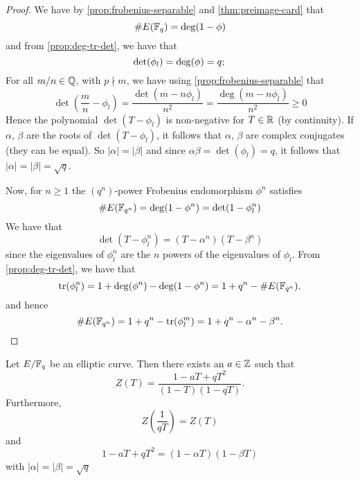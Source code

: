 \begin{proof}
	We have by \ref{prop:frobenius-separable}
	and \ref{thm:preimage-card}
	that
	\begin{equation*}
		\#E(\mathbb{F}_q) = \deg(1 - \phi)
	\end{equation*}
	and from \ref{prop:deg-tr-det}, we have that
	\begin{equation*}
		\det(\phi_l) = \deg(\phi) = q;\\
	\end{equation*}
	For all $m/n \in \mathbb{Q}$, with $p \nmid m$,
	we have using \ref{prop:frobenius-separable} that
	\begin{equation*}
		\det\left(\frac{m}{n} - \phi_l\right)
		= \frac{\det(m - n\phi_l)}{n^2}
		= \frac{\deg(m - n\phi_l)}{n^2} \geq 0
	\end{equation*}
	Hence the polynomial $\det(T - \phi_l)$ is non-negative for $T \in \mathbb{R}$
	(by continuity). If $\alpha$, $\beta$ are the roots of $\det(T - \phi_l)$,
	it follows that $\alpha$, $\beta$ are complex conjugates (they can be
	equal). So $|\alpha| = |\beta|$ and since $\alpha\beta = \det(\phi_l) = q$,
	it follows that $|\alpha| = |\beta| = \sqrt{q}$.

	Now, for $n \geq 1$ the $(q^n)$-power Frobenius endomorphism
	$\phi^n$ satisfies
	\begin{equation*}
		\#E(\mathbb{F}_{q^n}) = \deg(1 - \phi^n) = \det(1 - \phi_l^n)
	\end{equation*}
	We have that
	\begin{equation*}
		\det(T - \phi_l^n) = (T - \alpha^n)(T - \beta^n)
	\end{equation*}
	since the eigenvalues of $\phi_l^n$ are the $n$ powers
	of the eigenvalues of $\phi_l$. From 
	\ref{prop:deg-tr-det}, we have that
	\begin{equation*}
		\operatorname{tr}(\phi_l^n) = 1 + \deg(\phi^n) - \deg(1 - \phi^n)
		= 1 + q^n - \#E(\mathbb{F}_{q^n}).
	\end{equation*}
	and hence 
	\begin{equation*}
		\#E(\mathbb{F}_{q^n}) = 1 + q^n - \operatorname{tr}(\phi_l^m)
		= 1 + q^n - \alpha^n - \beta^n.
	\end{equation*}
\end{proof}

\begin{theorem}
	\label{thm:weil-elliptic}
	Let $E/\mathbb{F}_q$ be an elliptic curve. Then there exists an $a \in \mathbb{Z}$ such that
	\begin{equation*}
		Z(T) = \frac{1 - aT + qT^2}{(1-T)(1-qT)}.
	\end{equation*}
	Furthermore,
	\begin{equation*}
		Z\left(\frac{1}{qT}\right) = Z(T)
	\end{equation*}
	and
	\begin{equation*}
		1 - aT + qT^2 = (1 - \alpha T)(1 - \beta T)
	\end{equation*}
	with $|\alpha| = |\beta| = \sqrt{q}$
\end{theorem}

